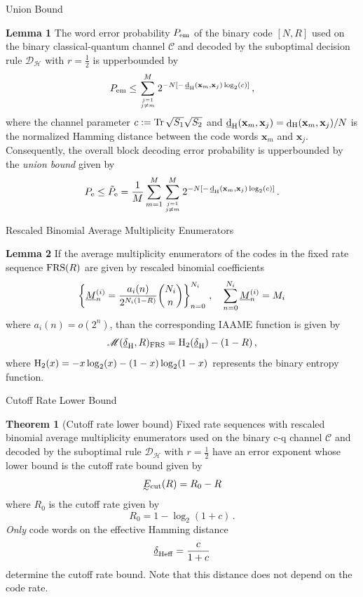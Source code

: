 \begin{slide*}\sf
\begin{center}{\bsf Union Bound}\end{center}
\vfill
{\bf Lemma 1}
The word error probability $P_{\rm em}$ of the binary
code $[N,R]$ used on the binary classical-quantum channel ${\mathscr C}$ and 
decoded by the suboptimal decision rule ${\mathscr D}_{\mathcal H}$ with 
$r=\frac{1}{2}$ is upperbounded by
$$ P_{\rm em} \le \sum_{j=1\atop j\neq m}^M 
     2^{-N [-\mathop{\underline{\rm d}}_{\rm H}\nolimits({\mathbf x}_m,{\mathbf x}_j) \log_2 (c)]}\,, $$
where the channel parameter $c:=\mathop{\rm Tr}\nolimits \sqrt{S_1} \sqrt{S_2}$ and 
$\mathop{\underline{\rm d}}_{\rm H}\nolimits({\mathbf x}_m,{\mathbf x}_j)=\mathop{\rm d}_{\rm H}\nolimits({\mathbf x}_m,{\mathbf x}_j)/N$ is the 
normalized Hamming distance between the code words ${\mathbf x}_m$ and 
${\mathbf x}_j$.
\vfill
Consequently, the overall block decoding error probability is upperbounded 
by the \emph{union bound} given by
$$ P_{\rm e} \le \tilde{P}_{\rm e} = 
   \frac{1}{M} \sum_{m=1}^M \sum_{j=1\atop j\neq m}^M 
           2^{-N [-\mathop{\underline{\rm d}}_{\rm H}\nolimits({\mathbf x}_m,{\mathbf x}_j)\log_2 (c)]}\,. $$
\vfill
\end{slide*}

\begin{slide*}\sf
\begin{center}{\bsf Rescaled Binomial Average Multiplicity Enumerators}
\end{center}
\vfill
{\bf Lemma 2}
If the average multiplicity enumerators of the codes in the fixed rate
sequence ${\rm FRS}(R)$ are given by
rescaled binomial coefficients
$$
  \left\{ \underline{M}_n^{(i)} = {a_i(n)\over 2^{N_i (1-R)}}  
  {N_i\choose n}\right\}_{n=0}^{N_i}\,,\quad 
  \sum_{n=0}^{N_i} \underline{M}_n^{(i)} = M_i
$$
where $a_i(n)=o(2^n)$, than the corresponding IAAME function is given by
$$
  {\mathscr M}(\underline{\delta}_{\rm H},R)_{\rm FRS}=
    {\rm H}_2(\underline{\delta}_{\rm H}) - (1 - R) \,,
$$
where ${\rm H}_2(x)=-x\log_2(x) - (1-x)\log_2 (1-x)$ represents the binary 
entropy function.
\vfill
\end{slide*}

\begin{slide*}\sf
\begin{center}{\bsf Cutoff Rate Lower Bound}\end{center}
\vfill
{\bf Theorem 1} (Cutoff rate lower bound)
Fixed rate sequences with rescaled binomial average multiplicity enumerators 
used on the binary c-q channel ${\mathscr C}$ and decoded by the suboptimal 
rule ${\mathscr D}_{\mathcal H}$ with $r=\frac{1}{2}$ have an error exponent 
whose lower bound is the cutoff rate bound given by 
$$  \lowE_{\rm cut}(R) = R_0 - R $$
where $R_0$ is the cutoff rate given by
$$ R_0 = 1-\log_2(1+c)\,. $$
\vfill
\emph{Only} code words on the effective Hamming distance
$$ \underline{\delta}_{\rm H eff}={c\over 1+c} $$
determine the cutoff rate bound. Note that this distance does not depend on 
the code rate.
\vfill
\end{slide*}

